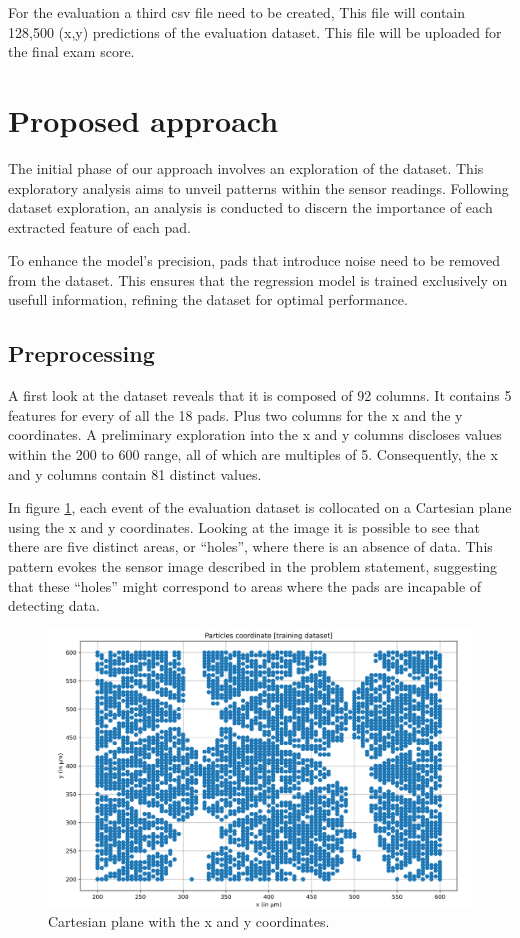 \documentclass[conference]{IEEEtran}
\begin{document}
For the evaluation a third csv file need to be created, This file will contain 128,500 (x,y) 
predictions of the evaluation dataset.
This file will be uploaded for the final exam score.


\section{Proposed approach}
The initial phase of our approach involves an exploration of the dataset.
This exploratory analysis aims to unveil patterns within the sensor readings.
Following dataset exploration, an analysis is conducted to discern the importance of
each extracted feature of each pad.

To enhance the model's precision, pads that introduce noise need to be removed from the dataset. 
This ensures that the regression model is trained exclusively on usefull information, 
refining the dataset for optimal performance.


\subsection{Preprocessing}
A first look at the dataset reveals that it is composed of 92 columns. 
It contains 5 features for every of all the 18 pads.
Plus two columns for the x and the y coordinates.
A preliminary exploration into the x and y columns discloses values within the 200 to 600 range, 
all of which are multiples of 5. Consequently, the x and y columns contain 81 distinct values.

In figure \ref{fig:cartesian_plane}, each event of the evaluation dataset is collocated on a Cartesian plane 
using the x and y coordinates. Looking at the image it is possible to see that there are five distinct areas, 
or “holes”, where there is an absence of data.
This pattern evokes the sensor image described in the problem statement, suggesting that these 
“holes” might correspond to areas where the pads are incapable of detecting data.\\

\begin{figure}[htbp]
\centerline{\includegraphics[width=\linewidth]{media/plot_dataset.png}}
\caption{Cartesian plane with the x and y coordinates.}
\label{fig:cartesian_plane}
\end{figure}
\end{document}
